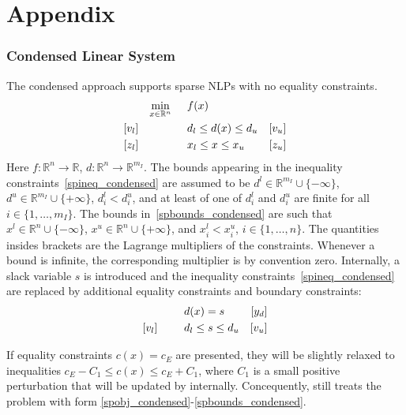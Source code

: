 \clearpage
\appendix
\section{Appendix}

\subsubsection{Condensed Linear System}

The condensed approach supports sparse NLPs with no equality constraints.
\begin{align}
&&&&\min_{x\in\mathbb{R}^n} & \hspace{0.5cm} f(x) &&&& \label{spobj_condensed}\\
&&[v_l]&&& \hspace{0.5cm} d_l \leq d(x) \leq d_u  &[v_u]&&&\label{spineq_condensed} \\
&&[z_l]&&& \hspace{0.5cm} x_l \leq x \leq x_u & [z_u] &&&\label{spbounds_condensed}
\end{align}
Here $f:\mathbb{R}^n\rightarrow\mathbb{R}$, $d:\mathbb{R}^n\rightarrow\mathbb{R}^{m_I}$. The bounds appearing in the inequality constraints~\eqref{spineq_condensed} are assumed to be $d^l\in\mathbb{R}^{m_I}\cup\{-\infty\}$, $d^u\in\mathbb{R}^{m_I}\cup\{+\infty\}$, $d_i^l < d_i^u$, and at least of one of $d_i^l$ and $d_i^u$ are finite for all $i\in\{1,\ldots,m_I\}$. The bounds in~\eqref{spbounds_condensed} are such that $x^l\in\mathbb{R}^{n}\cup\{-\infty\}$, $x^u\in\mathbb{R}^{n}\cup\{+\infty\}$, and $x_i^l < x_i^u$, $i\in\{1,\ldots,n\}$. The quantities insides brackets are the Lagrange multipliers of the constraints. Whenever a bound is infinite, the corresponding multiplier is by convention zero.
Internally, a slack variable $s$ is introduced and the inequality constraints~\eqref{spineq_condensed} are replaced by additional equality constraints and boundary constraints:
\begin{align}
&&&&& \hspace{0.5cm} d(x) = s &[y_d]&&& \\
&&[v_l]&&& \hspace{0.5cm} d_l \leq s \leq d_u  &[v_u]&&&\label{spineq_s} 
\end{align}

 If equality constraints $c(x)=c_E$ are presented, they will be slightly relaxed to inequalities $c_E - C_1\leq c(x)\leq c_E+C_1$, where $C_1$ is a small positive perturbation that will be updated by \Hi internally. Concequently, \Hi still treats the problem with form \eqref{spobj_condensed}-\eqref{spbounds_condensed}.\\

